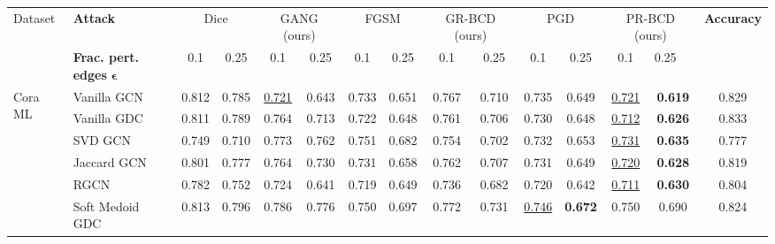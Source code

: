 \documentclass[letterpaper]{article} %
\begin{document}
\begin{table*}[ht]
{\begin{tabular}{llccccccccccccc}
    \toprule
    \multirow{2}{*}{Dataset}  & \textbf{Attack}                                    & \multicolumn{2}{c}{Dice} & \multicolumn{2}{c}{GANG (ours)}          & \multicolumn{2}{c}{FGSM}  & \multicolumn{2}{c}{GR-BCD (ours)} & \multicolumn{2}{c}{PGD}            & \multicolumn{2}{c}{PR-BCD (ours)}  & \textbf{Accuracy} \\
                              & \textbf{Frac. pert. edges} $\boldsymbol{\epsilon}$ & 0.1         & 0.25       & 0.1               & 0.25           & 0.1               & 0.25  & 0.1                 & 0.25            & 0.1               & 0.25           & 0.1               & \multicolumn{2}{l}{0.25}           \\
    \midrule
    \multirow{6}{*}{Cora ML}  & Vanilla GCN                                        & 0.812       & 0.785      & \underline{0.721} & 0.643          & 0.733             & 0.651 & 0.767               & 0.710           & 0.735             & 0.649          & \underline{0.721} & \textbf{0.619} & 0.829             \\
                              & Vanilla GDC                                        & 0.811       & 0.789      & 0.764             & 0.713          & 0.722             & 0.648 & 0.761               & 0.706           & 0.730             & 0.648          & \underline{0.712} & \textbf{0.626} & 0.833             \\
                              & SVD GCN                                            & 0.749       & 0.710      & 0.773             & 0.762          & 0.751             & 0.682 & 0.754               & 0.702           & 0.732             & 0.653          & \underline{0.731} & \textbf{0.635} & 0.777             \\
                              & Jaccard GCN                                        & 0.801       & 0.777      & 0.764             & 0.730          & 0.731             & 0.658 & 0.762               & 0.707           & 0.731             & 0.649          & \underline{0.720} & \textbf{0.628} & 0.819             \\
                              & RGCN                                               & 0.782       & 0.752      & 0.724             & 0.641          & 0.719             & 0.649 & 0.736               & 0.682           & 0.720             & 0.642          & \underline{0.711} & \textbf{0.630} & 0.804             \\
                              & Soft Medoid GDC                                    & 0.813       & 0.796      & 0.786             & 0.776          & 0.750             & 0.697 & 0.772               & 0.731           & \underline{0.746} & \textbf{0.672} & 0.750             & 0.690          & 0.824             \\

\end{tabular}}
\end{table*}
\end{document}
